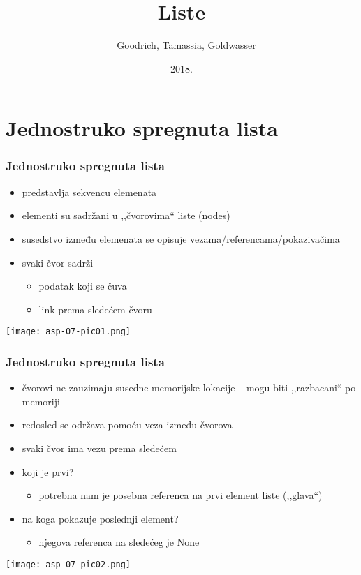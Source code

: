 \documentclass[compress]{beamer}
\title{Liste}
\author{\textcopyright \ \ Goodrich, Tamassia, Goldwasser}
\institute{Katedra za informatiku, Fakultet tehničkih nauka, Univerzitet u
Novom Sadu}
\date{2018.}
\begin{document}
\frame{\titlepage}

\section[1-Lista]{Jednostruko spregnuta lista}
\begin{frame}[fragile]
  \frametitle{Jednostruko spregnuta lista}
  \begin{itemize}
    \item predstavlja sekvencu elemenata
    \item elementi su sadržani u ,,čvorovima`` liste (nodes)
    \item susedstvo između elemenata se opisuje vezama/referencama/pokazivačima
    \item svaki čvor sadrži
    \begin{itemize}
      \item podatak koji se čuva
      \item link prema sledećem čvoru
    \end{itemize}
  \end{itemize}
  \begin{center}
    \texttt{[image: asp-07-pic01.png]}
  \end{center}
\end{frame}

\begin{frame}[fragile]
  \frametitle{Jednostruko spregnuta lista}
  \begin{itemize}
    \item čvorovi ne zauzimaju susedne memorijske lokacije -- mogu biti ,,razbacani`` po memoriji
    \item redosled se održava pomoću veza između čvorova
    \item svaki čvor ima vezu prema sledećem
    \item koji je prvi?
    \begin{itemize}
      \item potrebna nam je posebna referenca na prvi element liste (,,glava``)
    \end{itemize}
    \item na koga pokazuje poslednji element?
    \begin{itemize}
      \item njegova referenca na sledećeg je None
    \end{itemize}
  \end{itemize}
  \begin{center}
    \texttt{[image: asp-07-pic02.png]}
  \end{center}
\end{frame}
\end{document}
